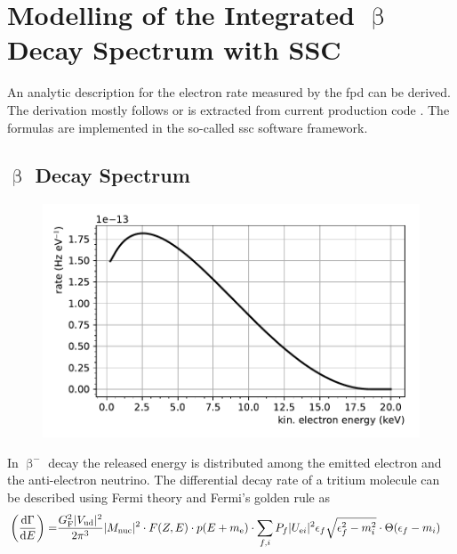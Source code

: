 
\section{Modelling of the Integrated \texorpdfstring{$\upbeta$}{Beta} Decay Spectrum with SSC}
\label{sec:intSpecModel}
An analytic description for the electron rate measured by the \gls{fpd} can be derived. The derivation mostly follows \cite{Kleesiek2019, Groh2015, Kleesiek2014} or is extracted from current production code \cite{KATRINCOL2019}. The formulas are implemented in the so-called \gls{ssc} software framework.

\subsection{\texorpdfstring{$\upbeta$}{Beta} Decay Spectrum}
\begin{figure}
    \centering
    \includegraphics[width=\textwidth]{chapter/katrin/fig/diffSpec.pdf}
    \label{fig:diffSpec}
\end{figure}
\label{sec:diffSpec}
In $\upbeta^-$ decay the released energy is distributed among the emitted electron and the anti-electron neutrino. The differential decay rate of a tritium molecule can be described using Fermi theory and Fermi's golden rule as
\begin{align}
    \label{eq:diffRate}
    \left(\frac{\mathop{}\!\mathrm{d}\Gamma}{\mathop{}\!\mathrm{d} E}\right) = &
    \frac{G_\mathrm{F}^2 \lvert V_\mathrm{ud}\rvert^2}{2 \pi^3}
    \lvert M_\mathrm{nuc}\rvert^2 \cdot
    F(Z, E) \cdot 
    p(E+m_{\mathrm{e}}) \cdot 
    \sum_{f,i} P_f \lvert U_{\mathrm{e} i}\rvert^2 \epsilon_f \sqrt{\epsilon_f^2-m_i^2} \cdot \Theta(\epsilon_f-m_i)
\end{align}
